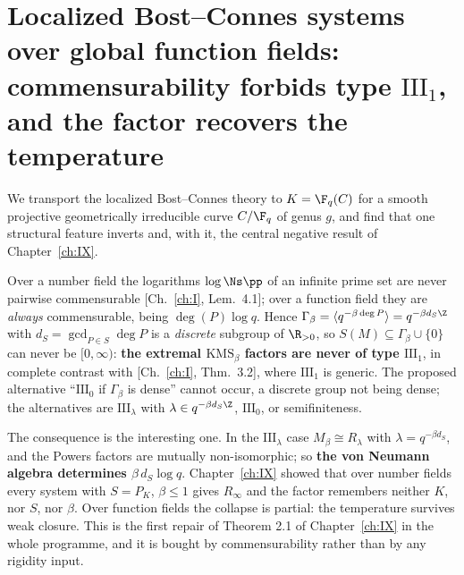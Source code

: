 \chapter[Bost--Connes systems over function fields]{Localized Bost--Connes systems over global function fields:\\ commensurability forbids type $\mathrm{III}_1$,\\ and the factor recovers the temperature}\label{ch:XVII}
\begin{summary}
We transport the localized Bost--Connes theory to $K=\F_q(C)$ for a smooth projective
geometrically irreducible curve $C/\F_q$ of genus $g$, and find that one structural feature
inverts and, with it, the central negative result of Chapter~\ref{ch:IX}.

Over a number field the logarithms $\log\Ns\pp$ of an infinite prime set are never pairwise
commensurable [Ch.~\ref{ch:I}, Lem.~4.1]; over a function field they are \emph{always}
commensurable, being $\deg(P)\log q$. Hence
$\Gamma_\beta=\langle q^{-\beta\deg P}\rangle=q^{-\beta d_S\Z}$ with
$d_S=\gcd_{P\in S}\deg P$ is a \emph{discrete} subgroup of $\R_{>0}$, so
$S(M)\subseteq\Gamma_\beta\cup\{0\}$ can never be $[0,\infty)$: \textbf{the extremal
$\mathrm{KMS}_\beta$ factors are never of type $\mathrm{III}_1$}, in complete contrast with
[Ch.~\ref{ch:I}, Thm.~3.2], where $\mathrm{III}_1$ is generic. The proposed alternative
``$\mathrm{III}_0$ if $\Gamma_\beta$ is dense'' cannot occur, a discrete group not being
dense; the alternatives are $\mathrm{III}_\lambda$ with $\lambda\in q^{-\beta d_S\Z}$,
$\mathrm{III}_0$, or semifiniteness.

The consequence is the interesting one. In the $\mathrm{III}_\lambda$ case
$M_\beta\cong R_\lambda$ with $\lambda=q^{-\beta d_S}$, and the Powers factors are mutually
non-isomorphic; so \textbf{the von Neumann algebra determines $\beta\,d_S\log q$}. Chapter~\ref{ch:IX}
showed that over number fields every system with $S=P_K$, $\beta\le1$ gives $R_\infty$ and the
factor remembers neither $K$, nor $S$, nor $\beta$. Over function fields the collapse is
partial: the temperature survives weak closure. This is the first repair of Theorem 2.1 of
Chapter~\ref{ch:IX} in the whole programme, and it is bought by commensurability rather
than by any rigidity input.


\end{summary}
